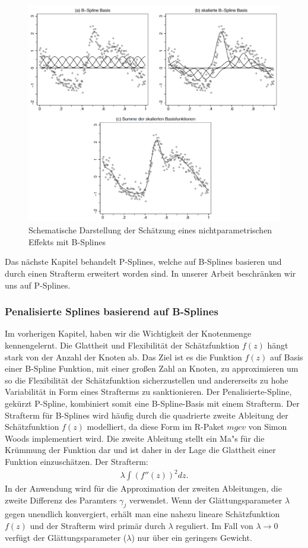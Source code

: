 \begin{figure}[H]
	\centering
	\includegraphics[width=.9\textwidth]{plots/b_spline.png}
	\caption{Schematische Darstellung der Schätzung eines nichtparametrischen Effekts mit B-Splines}
	\label{pic:b_spline}
\end{figure}

\noindent Das nächste Kapitel behandelt P-Splines, welche auf B-Splines basieren und durch einen Strafterm erweitert worden sind. In unserer Arbeit beschränken wir uns auf P-Splines.
\subsubsection{Penalisierte Splines basierend auf B-Splines}
Im vorherigen Kapitel, haben wir die Wichtigkeit der Knotenmenge kennengelernt. Die Glattheit und Flexibilität der Schätzfunktion $f(z)$ hängt stark von der Anzahl der Knoten ab. Das Ziel ist es die Funktion $f(z)$ auf Basis einer B-Spline Funktion, mit einer großen Zahl an Knoten, zu approximieren um so die Flexibilität der Schätzfunktion sicherzustellen und andererseits zu hohe Variabilität in Form eines Strafterms zu sanktionieren. Der Penalisierte-Spline, gekürzt P-Spline, kombiniert somit eine B-Spline-Basis mit einem Strafterm. Der Strafterm für B-Splines wird häufig durch die quadrierte zweite Ableitung der Schätzfunktion $f(z)$ modelliert, da diese Form im R-Paket $mgcv$ von Simon Woods implementiert wird. Die zweite Ableitung stellt ein Ma"s für die Krümmung der Funktion dar und ist daher in der Lage die Glattheit einer Funktion einzuschätzen.
Der Strafterm: 
\begin{align}
\lambda\int(f''(z))^2dz.
\end{align}
In der Anwendung wird für die Approximation der zweiten Ableitungen, die zweite Differenz des Paramters $\gamma_{j}$ verwendet. Wenn der Glättungsparameter $\lambda$ gegen unendlich konvergiert, erhält man eine nahezu lineare Schätzfunktion $f(z)$ und der Strafterm wird primär durch $\lambda$ reguliert. Im Fall von $\lambda \to 0$ verfügt der Glättungsparameter ($\lambda$) nur über ein geringers Gewicht.
